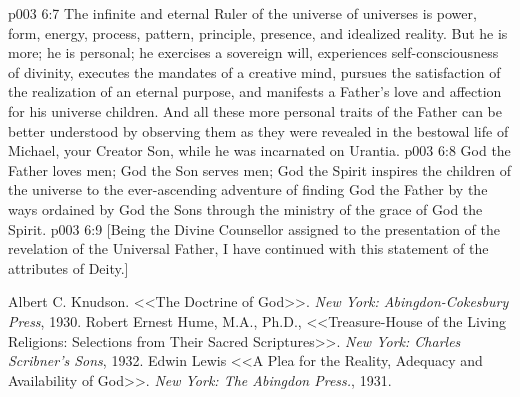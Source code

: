 \vs p003 6:7 \pc The infinite and eternal Ruler of the universe of universes is power, form, energy, process, pattern, principle, presence, and idealized reality. But he is more; he is personal; he exercises a sovereign will, experiences self\hyp{}consciousness of divinity, executes the mandates of a creative mind, pursues the satisfaction of the realization of an eternal purpose, and manifests a Father’s love and affection for his universe children. And all these more personal traits of the Father can be better understood by observing them as they were revealed in the bestowal life of Michael, your Creator Son, while he was incarnated on Urantia.
\vs p003 6:8 \pc God the Father loves men; God the Son serves men; God the Spirit inspires the children of the universe to the ever\hyp{}ascending adventure of finding God the Father by the ways ordained by God the Sons through the ministry of the grace of God the Spirit.
\vsetoff
\vs p003 6:9 [Being the Divine Counsellor assigned to the presentation of the revelation of the Universal Father, I have continued with this statement of the attributes of Deity.]
\quizlink
\begin{thebibliography}{100}
Albert C. Knudson.
{<<The Doctrine of God>>.}
{\em New York: Abingdon-Cokesbury Press}, 1930.
Robert Ernest Hume, M.A., Ph.D.,
{<<Treasure\hyp{}House of the Living Religions: Selections from Their Sacred Scriptures>>.}
{\em New York: Charles Scribner's Sons}, 1932.
Edwin Lewis
{<<A Plea for the Reality, Adequacy and Availability of God>>.}
{\em New York: The Abingdon Press.}, 1931.
\end{thebibliography}
